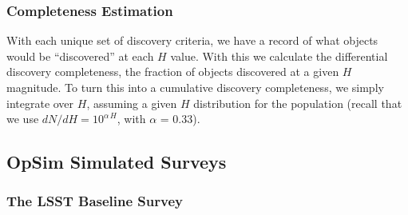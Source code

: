 \subsubsection{Completeness Estimation}

With each unique set of discovery criteria, we have a record of what objects would be ``discovered'' at each $H$ value.
With this we calculate the differential discovery completeness, the fraction of objects discovered at a given $H$ magnitude.
To turn this into a cumulative discovery completeness, we simply integrate over $H$, assuming a given $H$ distribution
for the population (recall that we use $dN/dH = 10^{\alpha\, H}$, with $\alpha$ = 0.33).


\subsection{OpSim Simulated Surveys \label{sec:surveys}}

\subsubsection{The LSST Baseline Survey}

